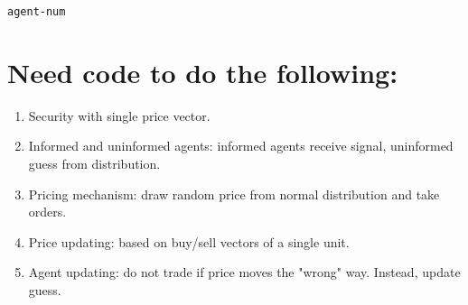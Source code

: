 \documentclass[11pt]{article}
\author{Matt}
\date{\today}
\title{}
\begin{document}
\tableofcontents

\begin{verbatim}
agent-num
\end{verbatim}
\section{Need code to do the following:}
\label{sec:org4cd107a}
\begin{enumerate}
\item Security with single price vector.
\item Informed and uninformed agents: informed agents receive signal, uninformed guess from distribution.
\item Pricing mechanism: draw random price from normal distribution and take orders.
\item Price updating: based on buy/sell vectors of a single unit.
\item Agent updating: do not trade if price moves the "wrong" way. Instead, update
guess.
\end{enumerate}


\printbibliography
\end{document}
